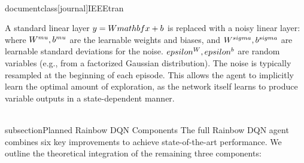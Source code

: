 \\documentclass[journal]{IEEEtran}
\begin{document}
A standard linear layer $y = W\\mathbf{x} + b$ is replaced with a noisy linear layer:
\\[
y = (W^{\\mu} + W^{\\sigma} \\odot \\epsilon^W) \\mathbf{x} + (b^{\\mu} + b^{\\sigma} \\odot \\epsilon^b)
\\]
where $W^{\\mu}, b^{\\mu}$ are the learnable weights and biases, and $W^{\\sigma}, b^{\\sigma}$ are learnable standard deviations for the noise. $\\epsilon^W, \\epsilon^b$ are random variables (e.g., from a factorized Gaussian distribution). The noise is typically resampled at the beginning of each episode. This allows the agent to implicitly learn the optimal amount of exploration, as the network itself learns to produce variable outputs in a state-dependent manner.

\\subsection{Planned Rainbow DQN Components}
The full Rainbow DQN agent \cite{hessel2017rainbow} combines six key improvements to achieve state-of-the-art performance. We outline the theoretical integration of the remaining three components:
\end{document}
